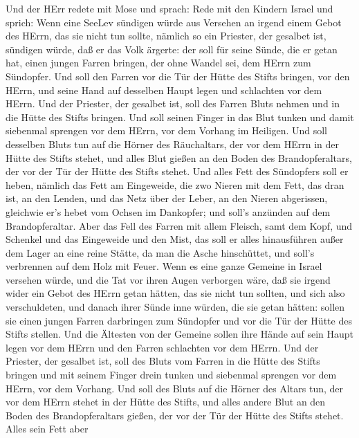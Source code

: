  Und der HErr redete mit Mose und sprach:  Rede
mit den Kindern Israel und sprich: Wenn eine SeeLev sündigen würde aus
Versehen an irgend einem Gebot des HErrn, das sie nicht tun sollte,
 nämlich so ein Priester, der gesalbet ist, sündigen würde,
daß er das Volk ärgerte: der soll für seine Sünde, die er getan hat,
einen jungen Farren bringen, der ohne Wandel sei, dem HErrn zum
Sündopfer.  Und soll den Farren vor die Tür der Hütte des
Stifts bringen, vor den HErrn, und seine Hand auf desselben Haupt legen
und schlachten vor dem HErrn.  Und der Priester, der
gesalbet ist, soll des Farren Bluts nehmen und in die Hütte des Stifts
bringen.  Und soll seinen Finger in das Blut tunken und
damit siebenmal sprengen vor dem HErrn, vor dem Vorhang im Heiligen.
 Und soll desselben Bluts tun auf die Hörner des
Räuchaltars, der vor dem HErrn in der Hütte des Stifts stehet, und alles
Blut gießen an den Boden des Brandopferaltars, der vor der Tür der Hütte
des Stifts stehet.  Und alles Fett des Sündopfers soll er
heben, nämlich das Fett am Eingeweide,  die zwo Nieren mit
dem Fett, das dran ist, an den Lenden, und das Netz über der Leber, an
den Nieren abgerissen,  gleichwie er's hebet vom Ochsen im
Dankopfer; und soll's anzünden auf dem Brandopferaltar. 
Aber das Fell des Farren mit allem Fleisch, samt dem Kopf, und Schenkel
und das Eingeweide und den Mist,  das soll er alles
hinausführen außer dem Lager an eine reine Stätte, da man die Asche
hinschüttet, und soll's verbrennen auf dem Holz mit Feuer. 
Wenn es eine ganze Gemeine in Israel versehen würde, und die Tat vor
ihren Augen verborgen wäre, daß sie irgend wider ein Gebot des HErrn
getan hätten, das sie nicht tun sollten, und sich also verschuldeten,
 und danach ihrer Sünde inne würden, die sie getan hätten:
sollen sie einen jungen Farren darbringen zum Sündopfer und vor die Tür
der Hütte des Stifts stellen.  Und die Ältesten von der
Gemeine sollen ihre Hände auf sein Haupt legen vor dem HErrn und den
Farren schlachten vor dem HErrn.  Und der Priester, der
gesalbet ist, soll des Bluts vom Farren in die Hütte des Stifts bringen
 und mit seinem Finger drein tunken und siebenmal sprengen
vor dem HErrn, vor dem Vorhang.  Und soll des Bluts auf die
Hörner des Altars tun, der vor dem HErrn stehet in der Hütte des Stifts,
und alles andere Blut an den Boden des Brandopferaltars gießen, der vor
der Tür der Hütte des Stifts stehet.  Alles sein Fett aber
